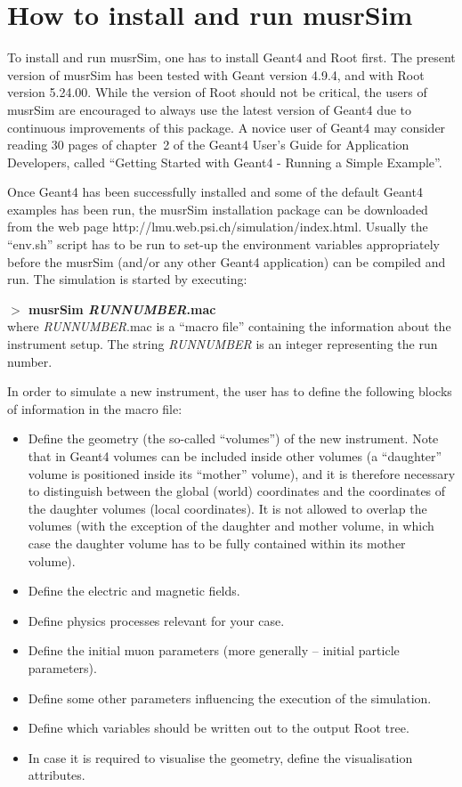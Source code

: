 \documentclass[twoside]{dis04}
\begin{document}
\section{How to install and run musrSim}
To install and run musrSim, one has to install Geant4 and Root first.
The present version of musrSim has been tested with Geant version 4.9.4,
and with Root version 5.24.00. While the version of Root should not be critical,
the users of musrSim are encouraged to always use the latest version of Geant4
due to continuous improvements of this package. A novice
user of Geant4 may consider reading 30 pages of chapter~2 of the 
Geant4 User's Guide for Application Developers, called 
``Getting Started with Geant4 - Running a Simple Example''.

Once Geant4 has been successfully installed and some of the default Geant4 examples
has been run, the musrSim installation package can be downloaded from the web page 
http://lmu.web.psi.ch/simulation/index.html.
Usually the ``env.sh'' script has to be run to set-up the environment variables
appropriately before the musrSim (and/or any other Geant4 application) can be compiled
and run.
The simulation is started by executing: 

{\bf $>$ musrSim \emph{RUNNUMBER}.mac} \\
where \emph{RUNNUMBER}.mac is a ``macro file'' containing the information about 
the instrument setup.  The string \emph{RUNNUMBER} is an integer representing the run number.

In order to simulate a new instrument, the user has to define the following blocks of information
in the macro file:
%
\begin{itemize}
	\item Define the geometry (the so-called ``volumes'') of the new instrument.
	Note that in Geant4 volumes can be included inside other volumes 
	(a ``daughter'' volume is positioned inside its ``mother'' volume),
	and it is therefore necessary to distinguish between the global (world)
	coordinates and the coordinates of the daughter volumes (local coordinates).
	It is not allowed to overlap the volumes (with the exception of the 
	daughter and mother volume, in which case the daughter volume has to be fully
	contained within its mother volume).
	\item Define the electric and magnetic fields.
	\item Define physics processes relevant for your case.
	\item Define the initial muon parameters (more generally -- initial particle parameters).
	\item Define some other parameters influencing the execution of the simulation.
	\item Define which variables should be written out to the output Root tree.
	\item In case it is required to visualise the geometry, define the visualisation attributes.
\end{itemize}
\end{document}
